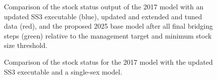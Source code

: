 \documentclass[
]{scrartcl}
\begin{document}
\begin{figure}


\caption{\label{fig-bridge19-comp4}Comparison of the stock status output
of the 2017 model with an updated SS3 executable (blue), updated and
extended and tuned data (red), and the proposed 2025 base model after
all final bridging steps (green) relative to the management target and
minimum stock size threshold.}

\end{figure}%

\begin{figure}


\caption{\label{fig-ss3exe_2}Comparison of the stock status for the 2017
model with the updated SS3 executable and a single-sex model.}

\end{figure}%
\end{document}
